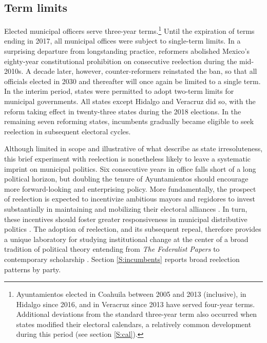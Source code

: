 \documentclass[letter,12pt]{article}
\begin{document}
\subsection{Term limits}
Elected municipal officers serve three-year terms.\footnote{Ayuntamientos elected in Coahuila between 2005 and 2013 (inclusive), in Hidalgo since 2016, and in Veracruz since 2013 have served four-year terms. Additional deviations from the standard three-year term also occurred when states modified their electoral calendars, a relatively common development during this period (see section \ref{S:cal}).} Until the expiration of terms ending in 2017, all municipal offices were subject to single-term limits. In a surprising departure from longstanding practice, reformers abolished Mexico's eighty-year constitutional prohibition on consecutive reelection during the mid-2010s. A decade later, however, counter-reformers reinstated the ban, so that all officials elected in 2030 and thereafter will once again be limited to a single term. In the interim period, states were permitted to adopt two-term limits for municipal governments. All states except Hidalgo and Veracruz did so, with the reform taking effect in twenty-three states during the 2018 elections. In the remaining seven reforming states, incumbents gradually became eligible to seek reelection in subsequent electoral cycles.

Although limited in scope and illustrative of what \citet{cox.mccubbins.2001} describe as state irresoluteness, this brief experiment with reelection is nonetheless likely to leave a systematic imprint on municipal politics. Six consecutive years in office falls short of a long political horizon, but doubling the tenure of Ayuntamientos should encourage more forward-looking and enterprising policy. More fundamentally, the prospect of reelection is expected to incentivize ambitious mayors and regidores to invest substantially in maintaining and mobilizing their electoral alliances \citep{cain.etal.1987, motolinia-reel-pork2021}. In turn, these incentives should foster greater responsiveness in municipal distributive politics \citep{cox.mccubbins.1986, jacobson.kernell.1983}. The adoption of reelection, and its subsequent repeal, therefore provides a unique laboratory for studying institutional change at the center of a broad tradition of political theory entending from \emph{The Federalist Papers} to contemporary scholarship \citep{madison.etal.1788, mayhew.1974, schlesinger.1966, miller.hammond.1989}. Section \ref{S:incumbents} reports broad reelection patterns by party.
\end{document}

